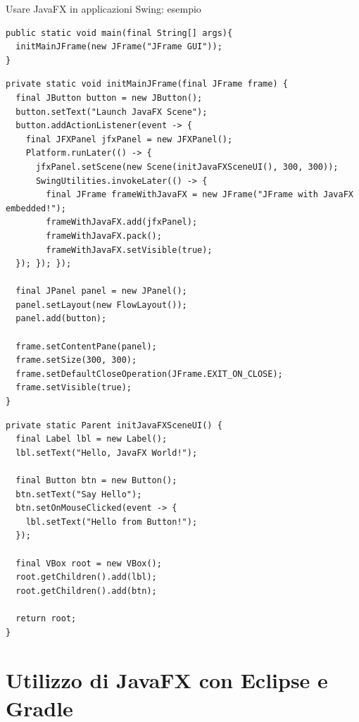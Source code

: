 \documentclass[xcolor=dvipsnames,presentation]{beamer}
\begin{document}
\begin{frame}{Usare JavaFX in applicazioni Swing: esempio}

\begin{lstlisting}[basicstyle=\tiny]
public static void main(final String[] args){
  initMainJFrame(new JFrame("JFrame GUI"));
}
\end{lstlisting}

\begin{lstlisting}[basicstyle=\tiny]
private static void initMainJFrame(final JFrame frame) {
  final JButton button = new JButton();
  button.setText("Launch JavaFX Scene");
  button.addActionListener(event -> {
    final JFXPanel jfxPanel = new JFXPanel();
    Platform.runLater(() -> {
      jfxPanel.setScene(new Scene(initJavaFXSceneUI(), 300, 300));
      SwingUtilities.invokeLater(() -> {
        final JFrame frameWithJavaFX = new JFrame("JFrame with JavaFX embedded!");
        frameWithJavaFX.add(jfxPanel);
        frameWithJavaFX.pack();
        frameWithJavaFX.setVisible(true);
  }); }); });

  final JPanel panel = new JPanel();
  panel.setLayout(new FlowLayout());
  panel.add(button);

  frame.setContentPane(panel);
  frame.setSize(300, 300);
  frame.setDefaultCloseOperation(JFrame.EXIT_ON_CLOSE);
  frame.setVisible(true);
}
\end{lstlisting}

\begin{lstlisting}[basicstyle=\tiny]
private static Parent initJavaFXSceneUI() {
  final Label lbl = new Label();
  lbl.setText("Hello, JavaFX World!");

  final Button btn = new Button();
  btn.setText("Say Hello");
  btn.setOnMouseClicked(event -> {
    lbl.setText("Hello from Button!");
  });

  final VBox root = new VBox();
  root.getChildren().add(lbl);
  root.getChildren().add(btn);

  return root;
}
\end{lstlisting}

\end{frame}

\section{Utilizzo di JavaFX con Eclipse e Gradle}
\end{document}
